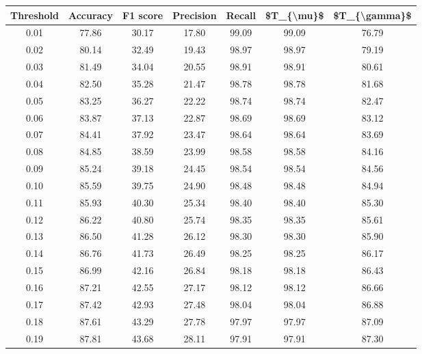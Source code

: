 \begin{tabular}{|c|c|c|c|c|c|c|}
\hline
 Threshold &  Accuracy &  F1 score &  Precision &  Recall &  \$T\_\{\textbackslash mu\}\$ &  \$T\_\{\textbackslash gamma\}\$ \\
\hline
      0.01 &     77.86 &     30.17 &      17.80 &   99.09 &      99.09 &         76.79 \\
      0.02 &     80.14 &     32.49 &      19.43 &   98.97 &      98.97 &         79.19 \\
      0.03 &     81.49 &     34.04 &      20.55 &   98.91 &      98.91 &         80.61 \\
      0.04 &     82.50 &     35.28 &      21.47 &   98.78 &      98.78 &         81.68 \\
      0.05 &     83.25 &     36.27 &      22.22 &   98.74 &      98.74 &         82.47 \\
      0.06 &     83.87 &     37.13 &      22.87 &   98.69 &      98.69 &         83.12 \\
      0.07 &     84.41 &     37.92 &      23.47 &   98.64 &      98.64 &         83.69 \\
      0.08 &     84.85 &     38.59 &      23.99 &   98.58 &      98.58 &         84.16 \\
      0.09 &     85.24 &     39.18 &      24.45 &   98.54 &      98.54 &         84.56 \\
      0.10 &     85.59 &     39.75 &      24.90 &   98.48 &      98.48 &         84.94 \\
      0.11 &     85.93 &     40.30 &      25.34 &   98.40 &      98.40 &         85.30 \\
      0.12 &     86.22 &     40.80 &      25.74 &   98.35 &      98.35 &         85.61 \\
      0.13 &     86.50 &     41.28 &      26.12 &   98.30 &      98.30 &         85.90 \\
      0.14 &     86.76 &     41.73 &      26.49 &   98.25 &      98.25 &         86.17 \\
      0.15 &     86.99 &     42.16 &      26.84 &   98.18 &      98.18 &         86.43 \\
      0.16 &     87.21 &     42.55 &      27.17 &   98.12 &      98.12 &         86.66 \\
      0.17 &     87.42 &     42.93 &      27.48 &   98.04 &      98.04 &         86.88 \\
      0.18 &     87.61 &     43.29 &      27.78 &   97.97 &      97.97 &         87.09 \\
      0.19 &     87.81 &     43.68 &      28.11 &   97.91 &      97.91 &         87.30 \\

\end{tabular}

